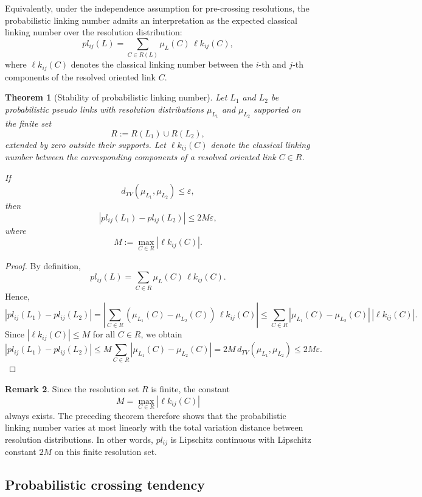 \documentclass[a4paper, reqno, 12pt]{amsart}
\theoremstyle{plain}
\newtheorem{theorem}{Theorem}[section]
\theoremstyle{definition}
\newtheorem{remark}[theorem]{Remark}
\begin{document}
Equivalently, under the independence assumption for pre-crossing resolutions, the probabilistic linking number admits an interpretation as the expected classical linking number over the resolution distribution:
\[
pl_{ij}(L)
=
\sum_{C\in R(L)}
\mu_L(C)\,\ell k_{ij}(C),
\]
where \(\ell k_{ij}(C)\) denotes the classical linking number between the \(i\)-th and \(j\)-th components of the resolved oriented link \(C\).

\begin{theorem}[Stability of probabilistic linking number]
Let \(L_1\) and \(L_2\) be probabilistic pseudo links with resolution distributions
\(\mu_{L_1}\) and \(\mu_{L_2}\) supported on the finite set
\[
R:=R(L_1)\cup R(L_2),
\]
extended by zero outside their supports. Let \(\ell k_{ij}(C)\) denote the classical linking number between the corresponding components of a resolved oriented link \(C\in R\).

If
\[
d_{TV}(\mu_{L_1},\mu_{L_2})\le \varepsilon,
\]
then
\[
|pl_{ij}(L_1)-pl_{ij}(L_2)|\le 2M\varepsilon,
\]
where
\[
M:=\max_{C\in R}|\ell k_{ij}(C)|.
\]
\end{theorem}

\begin{proof}
By definition,
\[
pl_{ij}(L)=\sum_{C\in R}\mu_L(C)\,\ell k_{ij}(C).
\]
Hence,
\[
|pl_{ij}(L_1)-pl_{ij}(L_2)|
=
\left|
\sum_{C\in R}
(\mu_{L_1}(C)-\mu_{L_2}(C))\,\ell k_{ij}(C)
\right|
\le
\sum_{C\in R}
|\mu_{L_1}(C)-\mu_{L_2}(C)|\,|\ell k_{ij}(C)|.
\]
Since \(|\ell k_{ij}(C)|\le M\) for all \(C\in R\), we obtain
\[
|pl_{ij}(L_1)-pl_{ij}(L_2)|
\le
M\sum_{C\in R}
|\mu_{L_1}(C)-\mu_{L_2}(C)|
=
2M\,d_{TV}(\mu_{L_1},\mu_{L_2})
\le
2M\varepsilon.
\]
\end{proof}


\begin{remark}\rm
Since the resolution set \(R\) is finite, the constant
\[
M=\max_{C\in R}|\ell k_{ij}(C)|
\]
always exists. The preceding theorem therefore shows that the probabilistic linking number varies at most linearly with the total variation distance between resolution distributions. In other words, \(pl_{ij}\) is Lipschitz continuous with Lipschitz constant \(2M\) on this finite resolution set.
\end{remark}




\subsection{Probabilistic crossing tendency}
\end{document}
